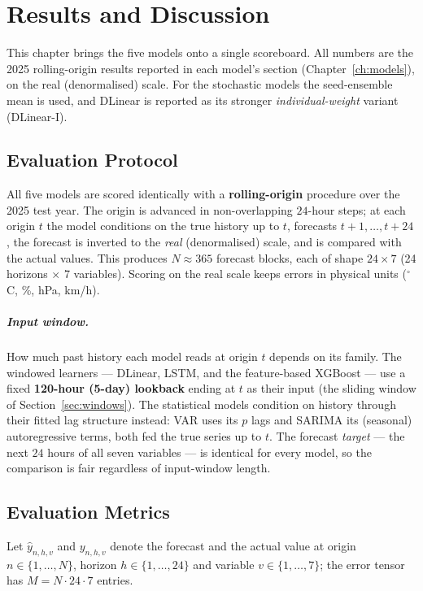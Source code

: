 \documentclass[12pt,a4paper,oneside]{report}
\begin{document}
\chapter{Results and Discussion}
\label{ch:results}

This chapter brings the five models onto a single scoreboard. All numbers are
the 2025 rolling-origin results reported in each model's section
(Chapter~\ref{ch:models}), on the real (denormalised) scale. For the stochastic
models the seed-ensemble mean is used, and DLinear is reported as its stronger
\emph{individual-weight} variant (DLinear-I).

\section{Evaluation Protocol}
\label{sec:eval-protocol}
All five models are scored identically with a \textbf{rolling-origin} procedure
over the 2025 test year. The origin is advanced in non-overlapping $24$-hour
steps; at each origin $t$ the model conditions on the true history up to $t$,
forecasts $t{+}1,\dots,t{+}24$, the forecast is inverted to the \emph{real}
(denormalised) scale, and is compared with the actual values. This produces
$N \approx 365$ forecast blocks, each of shape $24 \times 7$ (24 horizons
$\times$ 7 variables). Scoring on the real scale keeps errors in physical units
($^\circ$C, \%, hPa, km/h).

\paragraph{Input window.} How much past history each model reads at origin $t$
depends on its family. The windowed learners --- DLinear, LSTM, and the
feature-based XGBoost --- use a fixed \textbf{120-hour (5-day) lookback} ending at
$t$ as their input (the sliding window of Section~\ref{sec:windows}). The
statistical models condition on history through their fitted lag structure
instead: VAR uses its $p$ lags and SARIMA its (seasonal) autoregressive terms,
both fed the true series up to $t$. The forecast \emph{target} --- the next
$24$ hours of all seven variables --- is identical for every model, so the
comparison is fair regardless of input-window length.

\section{Evaluation Metrics}
\label{sec:metrics}
Let $\hat{y}_{n,h,v}$ and $y_{n,h,v}$ denote the forecast and the actual value at
origin $n\in\{1,\dots,N\}$, horizon $h\in\{1,\dots,24\}$ and variable
$v\in\{1,\dots,7\}$; the error tensor has $M = N\cdot 24\cdot 7$ entries.
\end{document}

